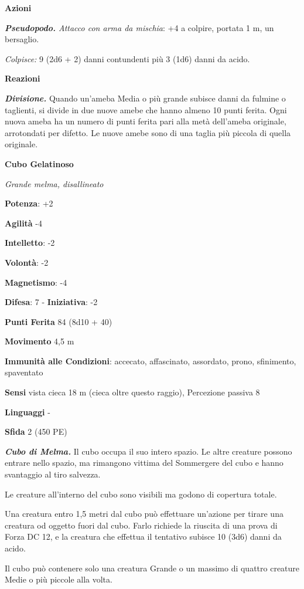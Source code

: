 \begin{multicols}{2}
\smallskip\textbf{Azioni}

\emph{\textbf{Pseudopodo.} Attacco con arma da mischia}: +4 a colpire,
portata 1 m, un bersaglio.

\emph{Colpisce:} 9 (2d6 + 2) danni contundenti più 3 (1d6) danni da
acido.

\textbf{Reazioni}

\emph{\textbf{Divisione.}} Quando un'ameba Media o più grande subisce
danni da fulmine o taglienti, si divide in due nuove amebe che hanno
almeno 10 punti ferita. Ogni nuova ameba ha un numero di punti ferita
pari alla metà dell'ameba originale, arrotondati per difetto. Le nuove
amebe sono di una taglia più piccola di quella originale.

\textbf{Cubo Gelatinoso}

\emph{Grande melma, disallineato}

\textbf{Potenza}: +2

\textbf{Agilità} -4

\textbf{Intelletto}: -2

\textbf{Volontà}: -2

\textbf{Magnetismo}: -4

\textbf{Difesa}: 7 - \textbf{Iniziativa}: -2

\textbf{Punti Ferita} 84 (8d10 + 40)

\textbf{Movimento} 4,5 m

\textbf{Immunità alle Condizioni}: accecato, affascinato, assordato,
prono, sfinimento, spaventato

\textbf{Sensi} vista cieca 18 m (cieca oltre questo raggio), Percezione
passiva 8

\textbf{Linguaggi} -

\textbf{Sfida} 2 (450 PE)\smallskip

\emph{\textbf{Cubo di Melma.}} Il cubo occupa il suo intero spazio. Le
altre creature possono entrare nello spazio, ma rimangono vittima del
Sommergere del cubo e hanno svantaggio al tiro salvezza.

Le creature all'interno del cubo sono visibili ma godono di copertura
totale.

Una creatura entro 1,5 metri dal cubo può effettuare un'azione per
tirare una creatura od oggetto fuori dal cubo. Farlo richiede la
riuscita di una prova di Forza DC 12, e la creatura che effettua il
tentativo subisce 10 (3d6) danni da acido.

Il cubo può contenere solo una creatura Grande o un massimo di quattro
creature Medie o più piccole alla volta.


\end{multicols}
